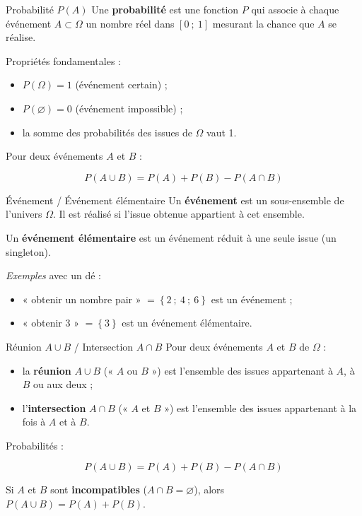 \documentclass[11pt,a4paper]{article}
\begin{document}
	\begin{ficheprobas}{Probabilité $P\left(A\right)$}
		Une \textbf{probabilité} est une fonction $P$ qui associe à chaque événement
		$A \subset \Omega$ un nombre réel dans $\left[0\ ;\ 1\right]$ mesurant la chance
		que $A$ se réalise.
		
		Propriétés fondamentales :
		\begin{itemize}
			\item $P\left(\Omega\right) = 1$ (événement certain) ;
			\item $P\left(\varnothing\right) = 0$ (événement impossible) ;
			\item la somme des probabilités des issues de $\Omega$ vaut 1.
		\end{itemize}
		Pour deux événements $A$ et $B$ :
		\begin{formule}
			\[ P\left(A \cup B\right) = P\left(A\right) + P\left(B\right) - P\left(A \cap B\right) \]
		\end{formule}
	\end{ficheprobas}
	
	\begin{ficheprobas}{Événement / Événement élémentaire}
		Un \textbf{événement} est un sous-ensemble de l'univers $\Omega$. Il est
		réalisé si l'issue obtenue appartient à cet ensemble.
		
		Un \textbf{événement élémentaire} est un événement réduit à une seule issue
		(un singleton).
		
		\emph{Exemples} avec un dé :
		\begin{itemize}
			\item « obtenir un nombre pair » $= \left\{2\ ;\ 4\ ;\ 6\right\}$ est un
			événement ;
			\item « obtenir 3 » $= \left\{3\right\}$ est un événement élémentaire.
		\end{itemize}
	\end{ficheprobas}
	
	\begin{ficheprobas}{Réunion $A \cup B$ / Intersection $A \cap B$}
		Pour deux événements $A$ et $B$ de $\Omega$ :
		\begin{itemize}
			\item la \textbf{réunion} $A \cup B$ (« $A$ ou $B$ ») est l'ensemble des
			issues appartenant à $A$, à $B$ ou aux deux ;
			\item l'\textbf{intersection} $A \cap B$ (« $A$ et $B$ ») est l'ensemble des
			issues appartenant à la fois à $A$ et à $B$.
		\end{itemize}
		Probabilités :
		\begin{formule}
			\[ P\left(A \cup B\right) = P\left(A\right) + P\left(B\right) - P\left(A \cap B\right) \]
		\end{formule}
		Si $A$ et $B$ sont \textbf{incompatibles}
		($A \cap B = \varnothing$), alors
		$P\left(A \cup B\right) = P\left(A\right) + P\left(B\right)$.
	\end{ficheprobas}
	
\end{document}
